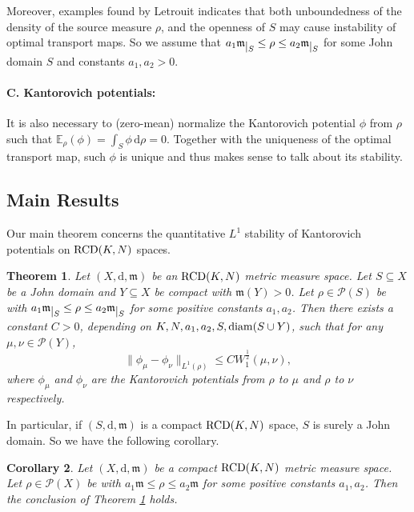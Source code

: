 \documentclass[a4paper,11pt]{article}
\numberwithin{equation}{section}
\theoremstyle{plain}
\newtheorem{theorem}{Theorem}[section]
\newtheorem{corollary}[theorem]{Corollary}
\theoremstyle{definition}
\theoremstyle{remark}
\newcommand{\mm}{\mathfrak m}
\newcommand{\rcdkn}{{\rm RCD}(K, N)}
\newcommand{\E}{\mathbb{E}}
\newcommand{\diam}{\mathop{\rm diam}\nolimits}
\renewcommand{\d}{{\mathrm d}}
\newcommand{\restr}[1]{\lower3pt\hbox{$|_{#1}$}}
\begin{document}
		

	
	Moreover, examples found by Letrouit \cite{letrouit2025unstableoptimaltransportmaps} indicates that both unboundedness of the density of the source measure $\rho$,  and  the openness of    $S$ may cause  instability  of optimal transport maps.  So we assume that $a_1\mm\restr{S} \leq \rho\leq a_2\mm\restr{S}$ for  some John domain $S$ and   constants $a_1,a_2>0$.
	

	 
	\paragraph{C.  Kantorovich potentials:}  It is also necessary to  (zero-mean) normalize the Kantorovich potential  $\phi$ from $\rho$  such that $\E_\rho(\phi)=\int_S\phi\,\d\rho=0$.  Together with the uniqueness of the optimal transport map, such  $\phi$ is  unique and thus makes sense to talk about its stability.

	
	
	\subsection{Main Results}
	Our main theorem concerns the quantitative  $L^1$ stability of Kantorovich potentials on ${\rm RCD}(K,N)$  spaces.  
	
	\begin{theorem}\label{thm0.1}
		Let $(X,\d,\mm)$ be an ${\rm RCD}(K,N)$ metric measure space. Let $S\subseteq X$ be a John domain and $Y\subseteq X$ be compact with $\mm(Y)>0$. Let $\rho\in \mathcal{P}(S)$  be with $a_1\mm\restr{S} \leq \rho\leq a_2\mm\restr{S}$ for some positive constants $a_1,a_2$. Then there exists a constant $C>0$, depending on $K,N,a_1,a_2, S, \diam(S\cup Y)$, such that for any $\mu,\nu\in\mathcal{P}(Y)$, 
		\begin{equation}
			\|\phi_\mu-\phi_\nu\|_{L^1(\rho)}\leq C W_1^\frac{1}{2}(\mu,\nu),
		\end{equation}
		where $\phi_\mu$ and $\phi_\nu$ are the Kantorovich potentials from $\rho$ to $\mu$ and $\rho$ to $\nu$ respectively.
	\end{theorem}
	
	In particular,  if $(S,  \d,  \mm)$  is a compact $\rcdkn$ space,    $S$ is surely a John domain.  So we have the following corollary.
	
	\begin{corollary}\label{cor}
		Let $(X,\d,\mm)$ be a compact ${\rm RCD}(K,N)$ metric measure space.  Let $\rho\in \mathcal{P}(X)$ be with $a_1\mm \leq \rho\leq a_2\mm$ for some positive constants $a_1,a_2$. Then the conclusion of Theorem \ref{thm0.1} holds.
	\end{corollary}
		
\end{document}
